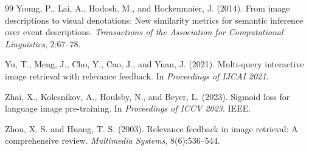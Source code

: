 \documentclass[12pt,a4paper]{article}
\begin{document}
\begin{thebibliography}{99}
Young, P., Lai, A., Hodosh, M., and Hockenmaier, J. (2014).
From image descriptions to visual denotations: New similarity metrics for semantic
inference over event descriptions.
\emph{Transactions of the Association for Computational Linguistics}, 2:67--78.

Yu, T., Meng, J., Cho, Y., Cao, J., and Yuan, J. (2021).
Multi-query interactive image retrieval with relevance feedback.
In \emph{Proceedings of IJCAI 2021}.

Zhai, X., Kolesnikov, A., Houlsby, N., and Beyer, L. (2023).
Sigmoid loss for language image pre-training.
In \emph{Proceedings of ICCV 2023}. IEEE.

Zhou, X. S. and Huang, T. S. (2003).
Relevance feedback in image retrieval: A comprehensive review.
\emph{Multimedia Systems}, 8(6):536--544.

\end{thebibliography}
\end{document}
